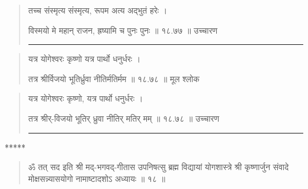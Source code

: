 \begin{quotation}

तच्च संस्मृत्य संस्मृत्य, रूपम अत्य अद्भुतं हरेः  ।  

विस्मयो मे महान्‌ राजन, ह्रष्यामि च पुनः पुनः  ॥ १८.७७ ॥  उच्चारण

\noindent\rule{16cm}{0.4pt} 
\end{quotation}


\begin{quotation}

यत्र योगेश्वरः कृष्णो यत्र पार्थो धनुर्धरः  ।  

तत्र श्रीर्विजयो भूतिर्ध्रुवा नीतिर्मतिर्मम  ॥ १८.७८ ॥  मूल श्लोक
\end{quotation}

\begin{quotation}

यत्र योगेश्वरः कृष्णो, यत्र पार्थो धनुर्धरः  ।  

तत्र श्रीर्-विजयो भूतिर्  ध्रुवा नीतिर् मतिर् मम्  ॥ १८.७८ ॥  उच्चारण

\noindent\rule{16cm}{0.4pt} 
\end{quotation}
\begin{center} ***** \end{center}

\begin{quotation}



ॐ तत् सद इति श्री मद्-भगवद्-गीतास उपनिषत्सु ब्रह्म विद्यायां योगशास्त्रे श्री कृष्णार्जुन संवादे  मोक्षसन्न्यासयोगो नामाष्टादशोऽ अध्यायः  ॥  १८  ॥ 
\end{quotation}

